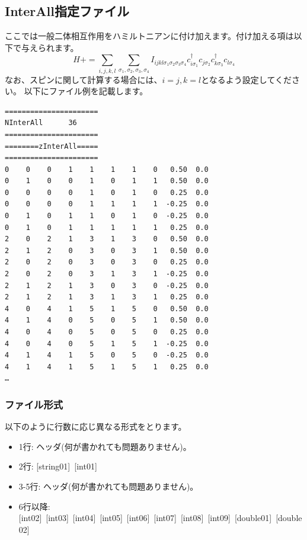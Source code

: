 \newpage
\subsection{InterAll指定ファイル}
\label{Subsec:interall}
ここでは一般二体相互作用をハミルトニアンに付け加えます。付け加える項は以下で与えられます。
\begin{equation}
H+=\sum_{i,j,k,l}\sum_{\sigma_1,\sigma_2, \sigma_3, \sigma_4}
I_{ijkl\sigma_1\sigma_2\sigma_3\sigma_4}c_{i\sigma_1}^{\dagger}c_{j\sigma_2}c_{k\sigma_3}^{\dagger}c_{l\sigma_4}
\end{equation}
なお、スピンに関して計算する場合には、$i=j, k=l$となるよう設定してください。
以下にファイル例を記載します。

\begin{minipage}{12.5cm}
\begin{screen}
\begin{verbatim}
====================== 
NInterAll      36  
====================== 
========zInterAll===== 
====================== 
0    0    0    1    1    1    1    0   0.50  0.0
0    1    0    0    1    0    1    1   0.50  0.0
0    0    0    0    1    0    1    0   0.25  0.0
0    0    0    0    1    1    1    1  -0.25  0.0
0    1    0    1    1    0    1    0  -0.25  0.0
0    1    0    1    1    1    1    1   0.25  0.0
2    0    2    1    3    1    3    0   0.50  0.0
2    1    2    0    3    0    3    1   0.50  0.0
2    0    2    0    3    0    3    0   0.25  0.0
2    0    2    0    3    1    3    1  -0.25  0.0
2    1    2    1    3    0    3    0  -0.25  0.0
2    1    2    1    3    1    3    1   0.25  0.0
4    0    4    1    5    1    5    0   0.50  0.0
4    1    4    0    5    0    5    1   0.50  0.0
4    0    4    0    5    0    5    0   0.25  0.0
4    0    4    0    5    1    5    1  -0.25  0.0
4    1    4    1    5    0    5    0  -0.25  0.0
4    1    4    1    5    1    5    1   0.25  0.0
…
\end{verbatim}
\end{screen}
\end{minipage}

\subsubsection{ファイル形式}
以下のように行数に応じ異なる形式をとります。
 \begin{itemize}
   \item  1行:  ヘッダ(何が書かれても問題ありません)。
   \item  2行:   [string01]~[int01]
   \item  3-5行:  ヘッダ(何が書かれても問題ありません)。
   \item  6行以降:
   [int02]~[int03]~[int04]~[int05]~[int06]~[int07]~[int08]~[int09]~[double01]~[double02] 
  \end{itemize}
